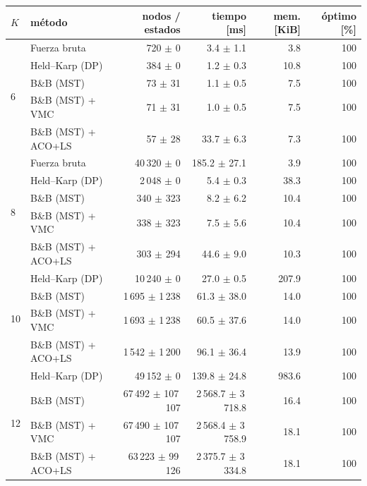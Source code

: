 \begin{tabular}{llrrrr}
\toprule
$K$ & método & nodos / estados & tiempo [ms] & mem. [KiB] & óptimo [\%] \\
\midrule
\multirow{5}{*}{6} & Fuerza bruta & 720 $\pm$ 0 & 3.4 $\pm$ 1.1 & 3.8 & 100 \\
 & Held--Karp (DP) & 384 $\pm$ 0 & 1.2 $\pm$ 0.3 & 10.8 & 100 \\
 & B\&B (MST) & 73 $\pm$ 31 & 1.1 $\pm$ 0.5 & 7.5 & 100 \\
 & B\&B (MST) + VMC & 71 $\pm$ 31 & 1.0 $\pm$ 0.5 & 7.5 & 100 \\
 & B\&B (MST) + ACO+LS & 57 $\pm$ 28 & 33.7 $\pm$ 6.3 & 7.3 & 100 \\
\midrule
\multirow{5}{*}{8} & Fuerza bruta & 40\,320 $\pm$ 0 & 185.2 $\pm$ 27.1 & 3.9 & 100 \\
 & Held--Karp (DP) & 2\,048 $\pm$ 0 & 5.4 $\pm$ 0.3 & 38.3 & 100 \\
 & B\&B (MST) & 340 $\pm$ 323 & 8.2 $\pm$ 6.2 & 10.4 & 100 \\
 & B\&B (MST) + VMC & 338 $\pm$ 323 & 7.5 $\pm$ 5.6 & 10.4 & 100 \\
 & B\&B (MST) + ACO+LS & 303 $\pm$ 294 & 44.6 $\pm$ 9.0 & 10.3 & 100 \\
\midrule
\multirow{4}{*}{10} & Held--Karp (DP) & 10\,240 $\pm$ 0 & 27.0 $\pm$ 0.5 & 207.9 & 100 \\
 & B\&B (MST) & 1\,695 $\pm$ 1\,238 & 61.3 $\pm$ 38.0 & 14.0 & 100 \\
 & B\&B (MST) + VMC & 1\,693 $\pm$ 1\,238 & 60.5 $\pm$ 37.6 & 14.0 & 100 \\
 & B\&B (MST) + ACO+LS & 1\,542 $\pm$ 1\,200 & 96.1 $\pm$ 36.4 & 13.9 & 100 \\
\midrule
\multirow{4}{*}{12} & Held--Karp (DP) & 49\,152 $\pm$ 0 & 139.8 $\pm$ 24.8 & 983.6 & 100 \\
 & B\&B (MST) & 67\,492 $\pm$ 107\,107 & 2\,568.7 $\pm$ 3\,718.8 & 16.4 & 100 \\
 & B\&B (MST) + VMC & 67\,490 $\pm$ 107\,107 & 2\,568.4 $\pm$ 3\,758.9 & 18.1 & 100 \\
 & B\&B (MST) + ACO+LS & 63\,223 $\pm$ 99\,126 & 2\,375.7 $\pm$ 3\,334.8 & 18.1 & 100 \\
\bottomrule
\end{tabular}
